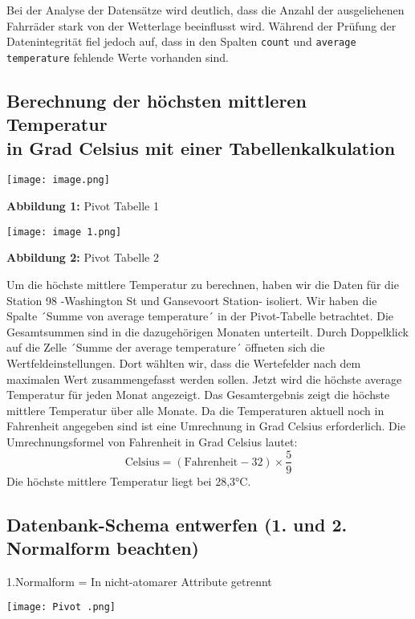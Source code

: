 \documentclass{article}
\begin{document}
Bei der Analyse der Datensätze wird deutlich, dass die Anzahl der ausgeliehenen Fahrräder stark von der Wetterlage beeinflusst wird. Während der Prüfung der Datenintegrität fiel jedoch auf, dass in den Spalten \texttt{count} und \texttt{average temperature} fehlende Werte vorhanden sind.



\subsection{Berechnung der höchsten mittleren Temperatur\\in Grad Celsius mit einer Tabellenkalkulation\\}

\texttt{[image: image.png]} 
\par \textbf{Abbildung 1:} Pivot Tabelle 1
\newline

\texttt{[image: image 1.png]}
\par \textbf{Abbildung 2:} Pivot Tabelle 2
\newline 

Um die höchste mittlere Temperatur zu berechnen, haben wir die Daten für die Station 98 -Washington St und Gansevoort Station- isoliert. Wir haben die Spalte ´Summe von average temperature´ in der Pivot-Tabelle betrachtet. Die Gesamtsummen sind in die dazugehörigen Monaten unterteilt. Durch Doppelklick auf die Zelle ´Summe der  average temperature´ öffneten sich die Wertfeldeinstellungen. Dort wählten wir, dass die Wertefelder nach dem maximalen Wert zusammengefasst werden sollen. Jetzt wird die höchste average Temperatur für jeden Monat angezeigt. Das Gesamtergebnis zeigt die höchste mittlere Temperatur über alle Monate. Da die Temperaturen aktuell noch in Fahrenheit angegeben sind ist eine Umrechnung in Grad Celsius erforderlich. Die Umrechnungsformel von Fahrenheit in Grad Celsius lautet: $$\text{Celsius} = (\text{Fahrenheit} - 32) \times \frac{5}{9}$$
Die höchste mittlere Temperatur liegt bei 28,3°C.\\
\newpage
\subsection{Datenbank-Schema entwerfen (1. und 2. Normalform beachten)\\}

1.Normalform = In nicht-atomarer Attribute getrennt

\texttt{[image: Pivot .png]}
\\
\end{document}
